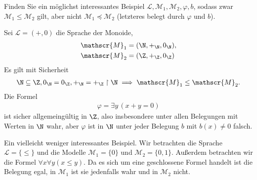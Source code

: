 
\begin{exercise}[142]
Finden Sie ein möglichst interessantes Beispiel $\mathscr{L},\mathscr{M}_1,\mathscr{M}_2,\varphi,b$,
sodass zwar $\mathscr{M}_1 \leq \mathscr{M}_2$ gilt, aber nicht $\mathscr{M}_1 \preccurlyeq \mathscr{M}_2$
(letzteres belegt durch $\varphi$ und $b$).
\end{exercise}


\begin{solution}
Sei $\mathscr{L} = (+,0)$ die Sprache der Monoide,
\begin{align*}
  \mathscr{M}_1 &= (\N,+_\N,0_\N), \\
  \mathscr{M}_2 &= (\Z,+_\Z,0_\Z)
\end{align*}
Es gilt mit Sicherheit
\begin{align*}
  \N \subseteq \Z, 0_\N = 0_\Z, +_\N = +_\Z\upharpoonright \N \implies \mathscr{M}_1 \leq \mathscr{M}_2.
\end{align*}
Die Formel
\begin{align*}
  \varphi = \exists y\,(x+y = 0)
\end{align*}
ist sicher allgemeingültig in $\Z$, also insbesondere unter allen Belegungen mit
Werten in $\N$ wahr, aber $\varphi$ ist in $\N$ unter jeder Belegung $b$ mit $b(x) \neq 0$ falsch.
\end{solution}


\begin{solution}
	Ein vielleicht weniger interessantes Beispiel. Wir betrachten die Sprache $\mathscr{L} = \{\leq\}$ und die Modelle $\mathscr{M}_1 = \{0\}$ und $\mathscr{M}_2 = \{0, 1\}$. Außerdem betrachten wir die Formel $\forall x \forall y (x \leq y)$. Da es sich um eine geschlossene Formel handelt ist die Belegung egal, in $\mathscr{M}_1$ ist sie jedenfalls wahr und in $\mathscr{M}_2$ nicht.
\end{solution}

